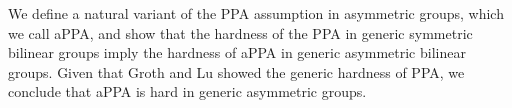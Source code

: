 We define a natural variant of the PPA assumption in asymmetric groups, which we call aPPA, and show that the hardness of the PPA in generic symmetric bilinear groups imply the hardness of aPPA in generic asymmetric bilinear groups. Given that Groth and Lu showed the generic hardness of PPA, we conclude that aPPA is hard in generic asymmetric groups. 

%

